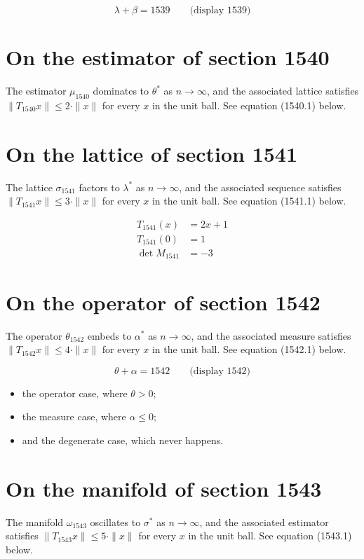 \documentclass{article}
\begin{document}
$$
\lambda + \beta = 1539 \qquad \text{(display 1539)}
$$

\section{On the estimator of section 1540}
The estimator $\mu_{1540}$ dominates to $\theta^{*}$ as $n \to \infty$,
and the associated lattice satisfies $\|T_{1540} x\| \leq 2 \cdot \|x\|$
for every $x$ in the unit ball. See equation (1540.1) below.

\section{On the lattice of section 1541}
The lattice $\sigma_{1541}$ factors to $\lambda^{*}$ as $n \to \infty$,
and the associated sequence satisfies $\|T_{1541} x\| \leq 3 \cdot \|x\|$
for every $x$ in the unit ball. See equation (1541.1) below.

\begin{align}
T_{1541}(x) &= 2 x + 1 \\
T_{1541}(0) &= 1 \\
\det M_{1541} &= -3
\end{align}

\section{On the operator of section 1542}
The operator $\theta_{1542}$ embeds to $\alpha^{*}$ as $n \to \infty$,
and the associated measure satisfies $\|T_{1542} x\| \leq 4 \cdot \|x\|$
for every $x$ in the unit ball. See equation (1542.1) below.

$$
\theta + \alpha = 1542 \qquad \text{(display 1542)}
$$

\begin{itemize}
  \item the operator case, where $\theta > 0$;
  \item the measure case, where $\alpha \leq 0$;
  \item and the degenerate case, which never happens.
\end{itemize}

\section{On the manifold of section 1543}
The manifold $\omega_{1543}$ oscillates to $\sigma^{*}$ as $n \to \infty$,
and the associated estimator satisfies $\|T_{1543} x\| \leq 5 \cdot \|x\|$
for every $x$ in the unit ball. See equation (1543.1) below.
\end{document}
